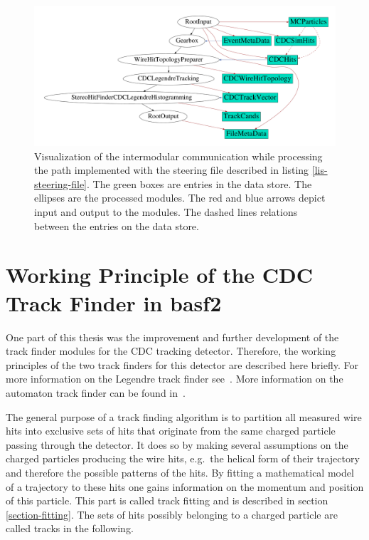\begin{figure}
 \centering
 \includegraphics[width=\linewidth]{figures/theory/dataflow.pdf}
 \caption[Visualization of intermodular communication.]{Visualization of the intermodular communication while processing the path implemented with the steering file described in listing \ref{lis-steering-file}. The green boxes are entries in the data store. The ellipses are the processed modules. The red and blue arrows depict input and output to the modules. The dashed lines relations between the entries on the data store.}
 \label{fig-viz-datastore}
\end{figure}


\section{Working Principle of the CDC Track Finder in basf2}

One part of this thesis was the improvement and further development of the track finder modules for the CDC tracking detector. Therefore, the working principles of the two track finders for this detector are described here briefly. For more information on the Legendre track finder see~\cite{kronenbitter}. More information on the automaton track finder can be found in~\cite{oliver}.

The general purpose of a track finding algorithm is to partition all measured wire hits into exclusive sets of hits that originate from the same charged particle passing through the detector. It does so by making several assumptions on the charged particles producing the wire hits, e.g.\ the helical form of their trajectory and therefore the possible patterns of the hits. By fitting a mathematical model of a trajectory to these hits one gains information on the momentum and position of this particle. This part is called track fitting and is described in section \ref{section-fitting}. The sets of hits possibly belonging to a charged particle are called tracks in the following.

